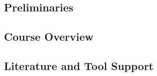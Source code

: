 \subsection{Preliminaries}

\subsection{Course Overview}

\subsection{Literature and Tool Support}

